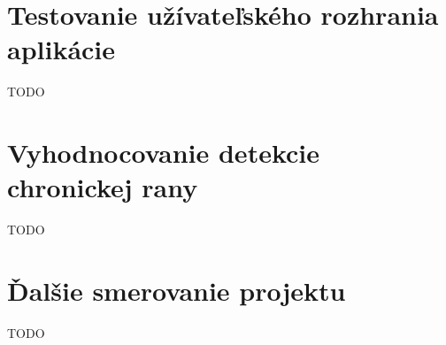 \section{Testovanie užívateľského rozhrania aplikácie}
TODO

\section{Vyhodnocovanie detekcie chronickej rany}
TODO

\section{Ďalšie smerovanie projektu}
TODO